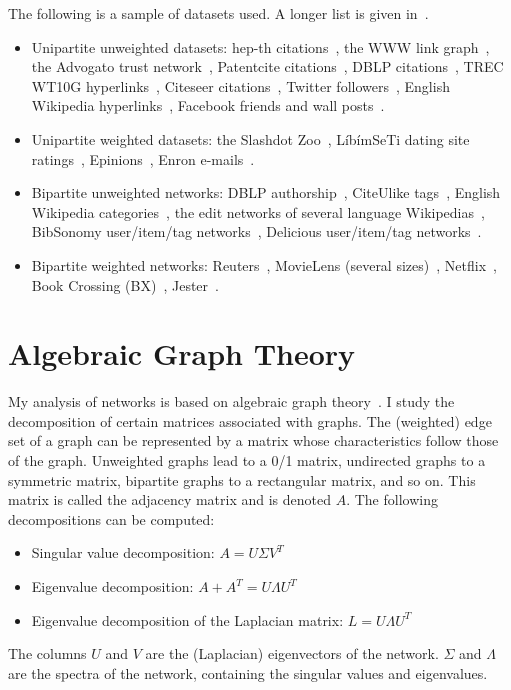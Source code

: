 \documentclass[10pt,twocolumn]{article}
\begin{document}
The following is a sample of datasets used.  A longer list is given
in~\cite{kunegis:network-survey}. 
\begin{itemize}
  \item Unipartite unweighted datasets:  hep-th citations~\cite{b352},
    the WWW link graph~\cite{b396},
    the Advogato trust network~\cite{b334}, Patentcite
    citations~\cite{b376}, DBLP citations~\cite{b525}, TREC WT10G 
    hyperlinks~\cite{b397}, Citeseer citations~\cite{b524}, Twitter
    followers~\cite{b545}, English Wikipedia hyperlinks~\cite{download.wikimedia.org}, Facebook 
    friends and wall posts~\cite{b421}.
  \item Unipartite weighted datasets:  the Slashdot Zoo~\cite{kunegis:slashdot-zoo},
    LíbímSeTi dating site ratings~\cite{b311}, Epinions~\cite{b325}, Enron e-mails~\cite{b431}.
  \item Bipartite unweighted networks: DBLP authorship~\cite{b525}, CiteUlike tags~\cite{b349},
    English Wikipedia categories~\cite{download.wikimedia.org}, the edit
    networks of several language
    Wikipedias~\cite{download.wikimedia.org}, BibSonomy user/item/tag
    networks~\cite{b346}, Delicious user/item/tag 
    networks~\cite{wetzker2008a}. 
  \item Bipartite weighted networks:  Reuters~\cite{b553}, MovieLens
    (several sizes)~\cite{www.grouplens.org/node/73}, 
    Netflix~\cite{b520}, Book Crossing (BX)~\cite{b523}, Jester~\cite{b7}. 
\end{itemize}

\section{Algebraic Graph Theory}
My analysis of networks is based on algebraic graph theory~\cite{b285}.
I study the decomposition of certain matrices associated with graphs.
The (weighted) edge set of a graph can be represented by a matrix whose
characteristics follow those of the graph.  Unweighted graphs lead to a
0/1 matrix, undirected graphs to a symmetric matrix, bipartite graphs to
a rectangular matrix, and so on.  This matrix is called the adjacency
matrix and is denoted $A$.  The following decompositions can be
computed:
\begin{itemize}
  \item Singular value decomposition:  $A = U\Sigma V^T$
  \item Eigenvalue decomposition:  $A+A^T = U\Lambda U^T$
  \item Eigenvalue decomposition of the Laplacian matrix:  $L =
    U\Lambda U^T$
\end{itemize}
The columns $U$ and $V$ are the (Laplacian) eigenvectors of the
network.  $\Sigma$  and $\Lambda$ are the spectra of the network,
containing the singular values and eigenvalues.  
\end{document}
